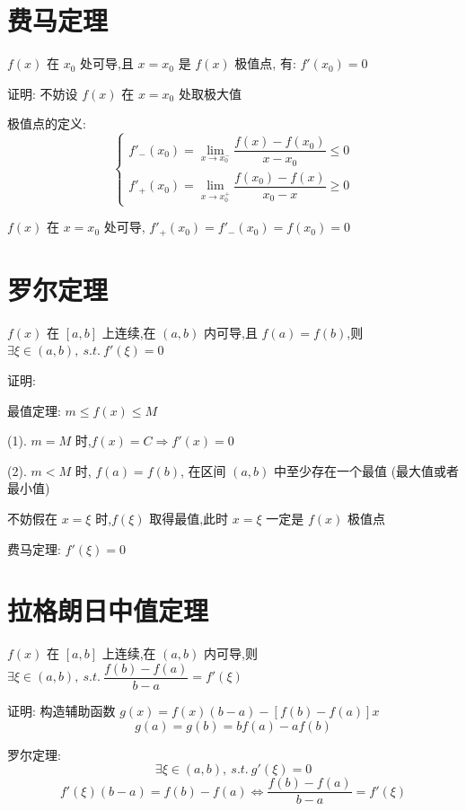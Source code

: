 \section{费马定理}
\begin{theorem}[费马定理]

	$f(x)$ 在 $x_{0}$ 处可导,且 $x=x_{0}$ 是 $f(x)$ 极值点, 有: $f'(x_{0})=0$

	证明: 不妨设 $f(x)$ 在 $x=x_{0}$ 处取极大值

	极值点的定义:
	$$\begin{cases}
		f'_{-}(x_{0})=\lim\limits_{x\rightarrow x_{0}^{-}}\dfrac{f(x)-f(x_{0})}{x-x_{0}}\leq 0 \\
		f'_{+}(x_{0})=\lim\limits_{x\rightarrow x_{0}^{+}}\dfrac{f(x_{0})-f(x)}{x_{0}-x}\geq 0
	\end{cases}$$

	$f(x)$ 在 $x=x_{0}$ 处可导, $f'_{+}(x_{0})=f'_{-}(x_{0})=f(x_{0})=0$
\end{theorem}
\section{罗尔定理}
\begin{theorem}[罗尔定理]

	$f(x)$ 在 $[a,b]$ 上连续,在 $(a,b)$ 内可导,且 $f(a)=f(b)$,则 $\exists \xi\in(a,b),\ s.t.\ f'(\xi)=0$

	证明: 
	
	最值定理: $m\leq f(x)\leq M$

	(1). $m=M$ 时,$f(x) = C \Rightarrow f'(x)=0$

	(2). $m<M$ 时, $f(a)=f(b)$, 在区间 $(a,b)$ 中至少存在一个最值 (最大值或者最小值)

	不妨假在 $x=\xi$ 时,$f(\xi)$ 取得最值,此时 $x=\xi$ 一定是 $f(x)$ 极值点
	
	费马定理: $f'(\xi)=0$

\end{theorem}
\section{拉格朗日中值定理}
\begin{theorem}[拉格朗日中值定理]

	$f(x)$ 在 $[a,b]$ 上连续,在 $(a,b)$ 内可导,则 $\exists \xi\in(a,b),\ s.t.\ \dfrac{f(b)-f(a)}{b-a}=f'(\xi)$

	证明: 构造辅助函数 $g(x)=f(x)(b-a)-[f(b)-f(a)]x$
	$$g(a)=g(b)=bf(a)-af(b)$$

	罗尔定理:
	$$\exists \xi\in(a,b),\ s.t.\ g'(\xi)=0$$
	$$ f'(\xi)(b-a)=f(b)-f(a)\Leftrightarrow  \frac{f(b)-f(a)}{b-a}=f'(\xi)$$
\end{theorem}
